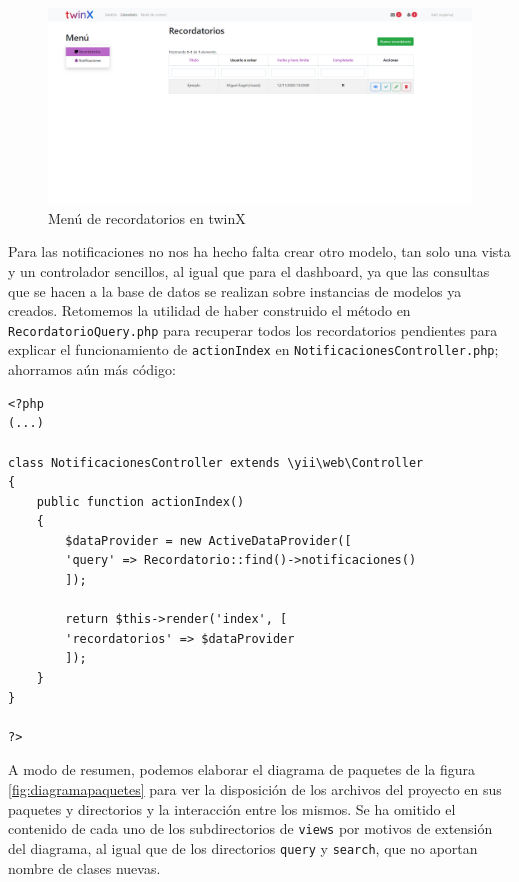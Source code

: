 \begin{figure}
	\centering
	\includegraphics[width=\linewidth]{img/Capturas de twinX/recordatorios}
	\caption{Menú de recordatorios en twinX}
	\label{fig:recordatoriostwinX}
\end{figure}

Para las notificaciones no nos ha hecho falta crear otro modelo, tan solo una vista y un controlador sencillos, al igual que para el dashboard, ya que las consultas que se hacen a la base de datos se realizan sobre instancias de modelos ya creados. Retomemos la utilidad de haber construido el método en \texttt{RecordatorioQuery.php} para recuperar todos los recordatorios pendientes para explicar el funcionamiento de \texttt{actionIndex} en \texttt{NotificacionesController.php}; ahorramos aún más código:

\begin{verbatim}
<?php
(...)

class NotificacionesController extends \yii\web\Controller
{
	public function actionIndex()
	{
		$dataProvider = new ActiveDataProvider([
		'query' => Recordatorio::find()->notificaciones()
		]);
		
		return $this->render('index', [
		'recordatorios' => $dataProvider
		]);
	}
}

?>

\end{verbatim}

A modo de resumen, podemos elaborar el diagrama de paquetes de la figura \ref{fig:diagramapaquetes} para ver la disposición de los archivos del proyecto en sus paquetes y directorios y la interacción entre los mismos. Se ha omitido el contenido de cada uno de los subdirectorios de \texttt{views} por motivos de extensión del diagrama, al igual que de los directorios \texttt{query} y \texttt{search}, que no aportan nombre de clases nuevas.

